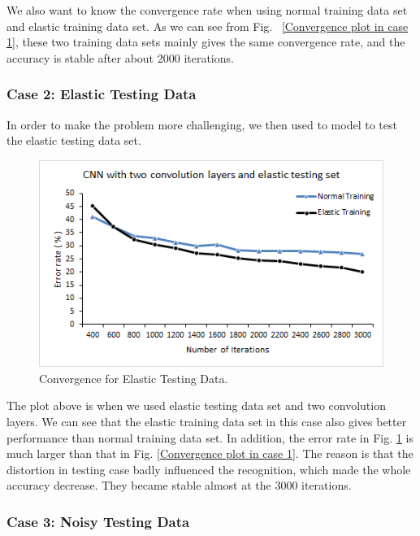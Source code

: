 We also want to know the convergence rate when using normal training data set and elastic training data set. As we can see from Fig. ~\ref{Convergence plot in case 1}, these two training data sets mainly gives the same convergence rate, and the accuracy is stable after about 2000 iterations.

\subsubsection*{Case 2: Elastic Testing Data}

In order to make the problem more challenging, we then used to model to test the elastic testing data set. 

\begin {figure}[t]
\centering
\includegraphics[width=0.9\columnwidth]{Paper_Fig8_Conv_Case2.png} %
\caption{Convergence for Elastic Testing Data.}
\label{Convergence plot in case 2}
\vspace{-10pt}
\end {figure}


The plot above is when we used elastic testing data set and two convolution layers. We can see that the elastic training data set in this case also gives better performance than normal training data set. In addition, the error rate in Fig. \ref{Convergence plot in case 2} is much larger than that in Fig. \ref{Convergence plot in case 1}. The reason is that the distortion in testing case badly influenced the recognition, which made the whole accuracy decrease. They became stable almost at the 3000 iterations.

\subsubsection*{Case 3: Noisy Testing Data}

